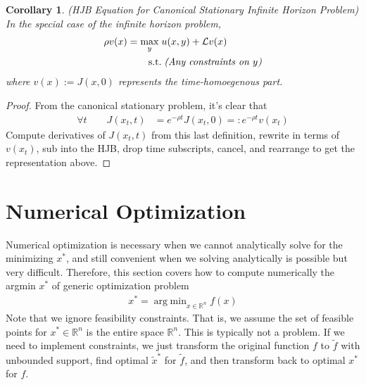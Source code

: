 \documentclass[12pt]{book}
\numberwithin{equation}{section} %
\theoremstyle{plain}
\newtheorem{cor}[thm]{Corollary}
\theoremstyle{definition}
\theoremstyle{remark}
\newcommand{\calL}{\mathcal{L}}
\newcommand{\Rn}{\mathbb{R}^n}
\DeclareMathOperator*{\argmin}{arg\;min}
\begin{document}
\begin{cor}
\emph{(HJB Equation for Canonical Stationary Infinite Horizon Problem)}
In the special case of the infinite horizon problem,
\begin{align*}
  \rho v(x)
  =
  \max_{y}
  \;&
  u(x,y)
  +
  \calL v(x)
  \\
  \qquad\text{s.t.}
  &
  \;
  \text{\emph{(Any constraints on $y$)}}
\end{align*}
where $v(x):=J(x,0)$ represents the time-homoegenous part.
\end{cor}
\begin{proof}
From the canonical stationary problem, it's clear that
\begin{align}
  \forall t
  \qquad
  J(x_t,t)
  &= e^{-\rho t}J(x_t,0)
  =: e^{-\rho t}v(x_t)
  \label{vdef}
\end{align}
Compute derivatives of $J(x_t,t)$ from this last definition, rewrite
in terms of $v(x_t)$, sub into the HJB, drop time
subscripts, cancel, and rearrange to get the representation above.
\end{proof}


\clearpage
\section{Numerical Optimization}

Numerical optimization is necessary when we cannot analytically solve
for the minimizing $x^*$, and still convenient when
we solving analytically is possible but very difficult.
Therefore, this section covers how to compute numerically the argmin
$x^*$ of generic optimization problem
\begin{align}
  \label{statement}
  x^* = \argmin_{x\in\Rn} f(x)
\end{align}
Note that we ignore feasibility constraints. That is, we assume the set
of feasible points for $x^*\in\Rn$ is the entire space $\Rn$.  This is
typically not a problem.  If we need to implement constraints, we just
transform the original function $f$ to $\tilde{f}$ with unbounded
support, find optimal $\tilde{x}^*$ for $\tilde{f}$, and then transform
back to optimal $x^*$ for $f$.
\end{document}
